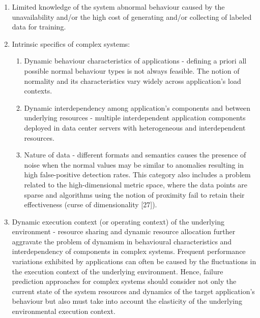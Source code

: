 \documentclass[]{usiinfprospectus}
\begin{document}
\begin{enumerate}
   \item Limited knowledge of the system abnormal behaviour caused by the unavailability and/or the high cost of generating and/or collecting of labeled data for training.
   \item Intrinsic specifics of complex systems:
   	\begin{enumerate}
		\item Dynamic behaviour characteristics of applications - defining a priori all possible normal behaviour types is not always feasible. The notion of normality and its characteristics vary widely across application's load contexts.
   		\item Dynamic interdependency among application's components and between underlying resources - multiple interdependent application components deployed in data center servers with heterogeneous and interdependent resources.
  	 	\item Nature of data - different formats and semantics causes the presence of noise when the normal values may be similar to anomalies resulting in high false-positive detection rates. This category also includes a problem related to the high-dimensional metric space, where the data points are sparse and algorithms using the notion of proximity fail to retain their effectiveness (curse of dimensionality [27]).
	\end{enumerate}
   \item Dynamic execution context (or operating context) of the underlying environment - resource sharing and dynamic resource allocation further aggravate the problem of dynamism in behavioural characteristics and interdependency of components in complex systems. Frequent performance variations exhibited by applications can often be caused by the fluctuations in the execution context of the underlying environment. Hence, failure prediction approaches for complex systems should consider not only the current state of the system resources and dynamics of the target application's behaviour but also must take into account the elasticity of the underlying environmental execution context.
\end{enumerate}
%
\end{document}
